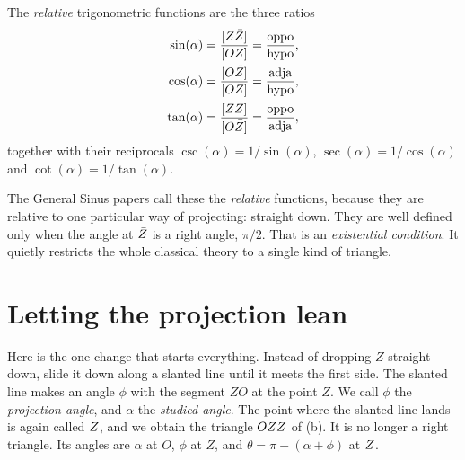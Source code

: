 \begin{definition}\label{def:relative}
The \emph{relative} trigonometric functions are the three ratios
\begin{align*}
\sin(\alpha) &= \frac{[Z\bar{Z}]}{[OZ]} = \frac{\text{oppo}}{\text{hypo}}, \\
\cos(\alpha) &= \frac{[O\bar{Z}]}{[OZ]} = \frac{\text{adja}}{\text{hypo}}, \\
\tan(\alpha) &= \frac{[Z\bar{Z}]}{[O\bar{Z}]} = \frac{\text{oppo}}{\text{adja}},
\end{align*}
together with their reciprocals $\csc(\alpha) = 1/\sin(\alpha)$, $\sec(\alpha) = 1/\cos(\alpha)$ and $\cot(\alpha) = 1/\tan(\alpha)$.
\end{definition}

The General Sinus papers call these the \emph{relative} functions, because they are relative to one particular way of projecting: straight down. They are well defined only when the angle at $\bar{Z}$ is a right angle, $\pi/2$. That is an \emph{existential condition}. It quietly restricts the whole classical theory to a single kind of triangle.

\section{Letting the projection lean}\label{sec:lean}

Here is the one change that starts everything. Instead of dropping $Z$ straight down, slide it down along a slanted line until it meets the first side. The slanted line makes an angle $\phi$ with the segment $ZO$ at the point $Z$. We call $\phi$ the \emph{projection angle}, and $\alpha$ the \emph{studied angle}. The point where the slanted line lands is again called $\bar{Z}$, and we obtain the triangle $OZ\bar{Z}$ of (b). It is no longer a right triangle. Its angles are $\alpha$ at $O$, $\phi$ at $Z$, and $\theta = \pi - (\alpha + \phi)$ at $\bar{Z}$.

